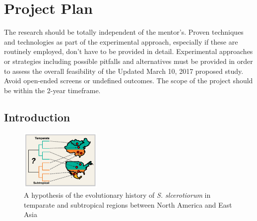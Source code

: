 \documentclass[12pt,letterpaper]{article}
\begin{document}
\section{Project Plan}

The research should be totally independent of the mentor's. Proven techniques
and technologies as part of the experimental approach, especially if these are
routinely employed, don't have to be provided in detail. Experimental
approaches or strategies including possible pitfalls and alternatives must be
provided in order to assess the overall feasibility of the Updated March 10,
2017 proposed study. Avoid open-ended screens or undefined outcomes. The scope
of the project should be within the 2-year timeframe.

\subsection{Introduction}




\begin{figure} %
  \includegraphics[width=0.35\textwidth]{figure/us-china.pdf}
  \caption{A hypothesis of the evolutionary history of \textit{S. slcerotiorum} in temparate and subtropical regions between North America and East Asia}
  \label{fig:us-china}
\end{figure}
\end{document}
